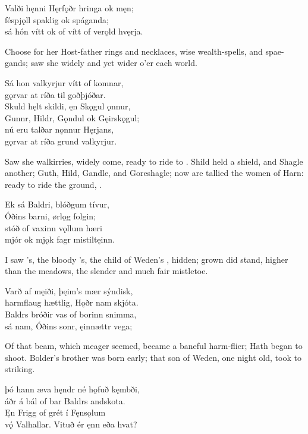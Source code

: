 \bva Valði hęnni Hęrfǫðr \hld hringa ok męn; \\%
féspjǫll spaklig \hld ok spáganda; \\%
sá hón vítt ok of vítt \hld of verǫld hvęrja.\eva

\bvb Choose for her Host-father rings and necklaces, wise wealth-spells, and spae-gands; saw she widely and yet wider o’er each world.\evb

\bva Sá hon valkyrjur \hld vítt of komnar, \\%
gǫrvar at ríða \hld til goðþjóðar. \\%
Skuld hęlt skildi, \hld ęn Skǫgul ǫnnur, \\%
Gunnr, Hildr, Gǫndul \hld ok Gęirskǫgul; \\%
nú eru talðar \hld nǫnnur Hęrjans, \\%
gǫrvar at ríða \hld grund valkyrjur.\eva

\bvb Saw she walkirries, widely come, ready to ride to . Shild held a shield, and Shagle another; Guth, Hild, Gandle, and Goreshagle; now are tallied the women of Harn: ready to ride the ground, .\evb

\bva Ek sá Baldri, \hld blóðgum tívur, \\%
Óðins barni, \hld ørlǫg folgin; \\%
stóð of vaxinn \hld vǫllum hæri \\%
mjór ok mjǫk fagr \hld mistiltęinn.\eva

\bvb I saw ’s, the bloody ’s, the child of Weden’s , hidden; grown did stand, higher than the meadows, the slender and much fair mistletoe.\evb

\bva Varð af męiði, \hld þęim’s mær sýndisk, \\%
harmflaug hættlig, \hld Hǫðr nam skjóta. \\%
Baldrs bróðir vas \hld of borinn snimma, \\%
sá nam, Óðins sonr, \hld ęinnættr vega;\eva

\bvb Of that beam, which meager seemed, became a baneful harm-flier; Hath began to shoot. Bolder’s brother was born early; that son of Weden, one night old, took to striking.\evb

\bva þó hann æva hęndr \hld né hǫfuð kęmbði, \\%
áðr á bál of bar \hld Baldrs andskota. \\%
Ęn Frigg of grét \hld í Fęnsǫlum \\%
vǫ́ Valhallar. \hld Vituð ér ęnn eða hvat?\eva

